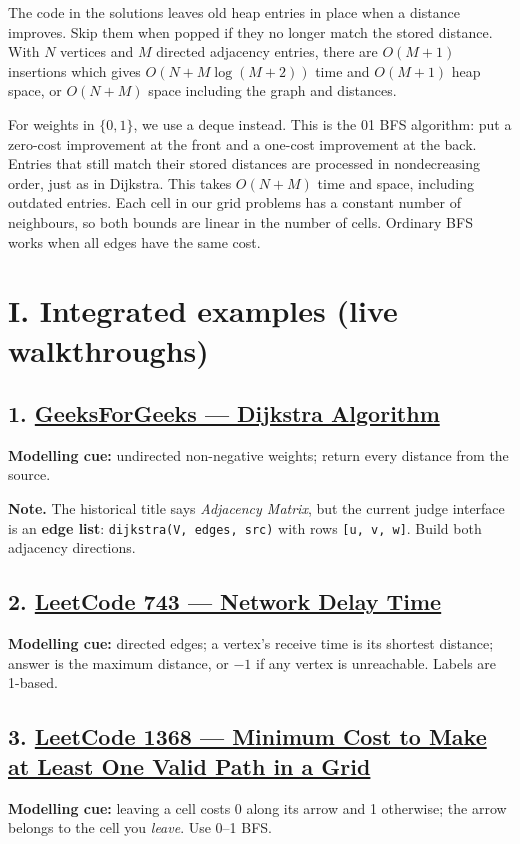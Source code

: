 \documentclass[12pt]{article}
\begin{document}
The code in the solutions leaves old heap entries in place when a distance improves. Skip them when popped if they no longer match the stored distance. With $N$ vertices and $M$ directed adjacency entries, there are $O(M+1)$ insertions which gives $O(N+M\log(M+2))$ time and $O(M+1)$ heap space, or $O(N+M)$ space including the graph and distances.

For weights in $\{0,1\}$, we use a deque instead. This is the 01 BFS algorithm: put a zero-cost improvement at the front and a one-cost improvement at the back. Entries that still match their stored distances are processed in nondecreasing order, just as in Dijkstra. This takes $O(N+M)$ time and space, including outdated entries. Each cell in our grid problems has a constant number of neighbours, so both bounds are linear in the number of cells. Ordinary BFS works when all edges have the same cost.

\section*{I. Integrated examples (live walkthroughs)}

\subsection*{1. \href{https://www.geeksforgeeks.org/problems/implementing-dijkstra-set-1-adjacency-matrix/1}{GeeksForGeeks --- Dijkstra Algorithm}}
\textbf{Modelling cue:} undirected non-negative weights; return every distance from the source.

\textbf{Note.} The historical title says \emph{Adjacency Matrix}, but the current judge interface is an \textbf{edge list}: \texttt{dijkstra(V, edges, src)} with rows \texttt{[u, v, w]}. Build both adjacency directions.

\subsection*{2. \href{https://leetcode.com/problems/network-delay-time/}{LeetCode 743 --- Network Delay Time}}
\textbf{Modelling cue:} directed edges; a vertex's receive time is its shortest distance; answer is the maximum distance, or $-1$ if any vertex is unreachable. Labels are 1-based.

\subsection*{3. \href{https://leetcode.com/problems/minimum-cost-to-make-at-least-one-valid-path-in-a-grid/}{LeetCode 1368 --- Minimum Cost to Make at Least One Valid Path in a Grid}}
\textbf{Modelling cue:} leaving a cell costs 0 along its arrow and 1 otherwise; the arrow belongs to the cell you \emph{leave}. Use 0--1 BFS.
\end{document}
